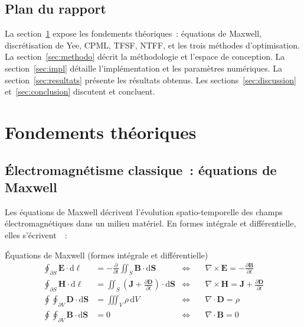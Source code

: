 \documentclass[12pt,a4paper]{article}
\newcommand{\vE}{\bm{E}}
\newcommand{\vH}{\bm{H}}
\newcommand{\vB}{\bm{B}}
\newcommand{\vD}{\bm{D}}
\newcommand{\vJ}{\bm{J}}
\newcommand{\nab}{\nabla}
\begin{document}
\subsection{Plan du rapport}

La section~\ref{sec:theo} expose les fondements théoriques~: équations de Maxwell,
discrétisation de Yee, CPML, TFSF, NTFF, et les trois méthodes d'optimisation.
La section~\ref{sec:methodo} décrit la méthodologie et l'espace de conception.
La section~\ref{sec:impl} détaille l'implémentation et les paramètres numériques.
La section~\ref{sec:resultats} présente les résultats obtenus.
Les sections~\ref{sec:discussion} et~\ref{sec:conclusion} discutent et concluent.

\section{Fondements théoriques}
\label{sec:theo}

\subsection{Électromagnétisme classique~: équations de Maxwell}
\label{ssec:maxwell}

Les équations de Maxwell décrivent l'évolution spatio-temporelle des champs
électromagnétiques dans un milieu matériel. En formes intégrale et différentielle,
elles s'écrivent~\cite{Jackson1999,Griffiths1999}~:

\begin{defbox}{Équations de Maxwell (formes intégrale et différentielle)}
\vspace{-4pt}
\begin{align}
    \oint_{\partial S} \vE \cdot \mathrm{d}\bm{\ell} &= -\frac{\partial}{\partial t}
    \iint_S \vB \cdot \mathrm{d}\bm{S}
    & \Longleftrightarrow &\quad
    \nab \times \vE = -\frac{\partial \vB}{\partial t}
    \label{eq:faraday}\\[4pt]
    \oint_{\partial S} \vH \cdot \mathrm{d}\bm{\ell} &= \iint_S
    \left(\vJ + \frac{\partial \vD}{\partial t}\right) \cdot \mathrm{d}\bm{S}
    & \Longleftrightarrow &\quad
    \nab \times \vH = \vJ + \frac{\partial \vD}{\partial t}
    \label{eq:ampere}\\[4pt]
    \oint\!\!\!\oint_{\partial V} \vD \cdot \mathrm{d}\bm{S} &= \iiint_V \rho \, \mathrm{d}V
    & \Longleftrightarrow &\quad
    \nab \cdot \vD = \rho
    \label{eq:gauss-e}\\[4pt]
    \oint\!\!\!\oint_{\partial V} \vB \cdot \mathrm{d}\bm{S} &= 0
    & \Longleftrightarrow &\quad
    \nab \cdot \vB = 0
    \label{eq:gauss-b}
\end{align}
\end{defbox}
\end{document}
